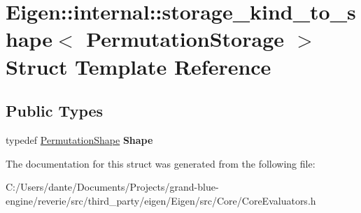 \hypertarget{struct_eigen_1_1internal_1_1storage__kind__to__shape_3_01_permutation_storage_01_4}{}\section{Eigen\+::internal\+::storage\+\_\+kind\+\_\+to\+\_\+shape$<$ Permutation\+Storage $>$ Struct Template Reference}
\label{struct_eigen_1_1internal_1_1storage__kind__to__shape_3_01_permutation_storage_01_4}
\subsection*{Public Types}
\begin{DoxyCompactItemize}
\item 
\mbox{\label{struct_eigen_1_1internal_1_1storage__kind__to__shape_3_01_permutation_storage_01_4_a9888b41ea7b40b2c9d501c7a038cce75}} 
typedef \mbox{\hyperlink{struct_eigen_1_1_permutation_shape}{Permutation\+Shape}} {\bfseries Shape}
\end{DoxyCompactItemize}


The documentation for this struct was generated from the following file\+:\begin{DoxyCompactItemize}
\item 
C\+:/\+Users/dante/\+Documents/\+Projects/grand-\/blue-\/engine/reverie/src/third\+\_\+party/eigen/\+Eigen/src/\+Core/Core\+Evaluators.\+h\end{DoxyCompactItemize}
